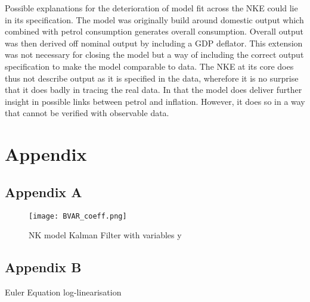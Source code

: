 \documentclass[12pt,a4paper,english]{article} %
\let\oldsection\section
\renewcommand\section{\clearpage\oldsection}
\begin{document}
	Possible explanations for the deterioration of model fit across the NKE could lie in its specification. The model was originally build around domestic output which combined with petrol consumption generates overall consumption. Overall output was then derived off nominal output by including a GDP deflator. This extension was not necessary for closing the model but a way of including the correct output specification to make the model comparable to data. The NKE at its core does thus not describe output as it is specified in the data, wherefore it is no surprise that it does badly in tracing the real data. In that the model does deliver further insight in possible links between petrol and inflation. However, it does so in a way that cannot be verified with observable data.
	
	

	\section*{Appendix}
	
	\pagebreak
	\subsection*{Appendix A} \label{appa}

	\begin{figure}[H]
		\begin{center}
			\texttt{[image: BVAR\_coeff.png]}
			\caption{NK model Kalman Filter with variables y}\label{fig:bvar_coef}
		\end{center}
	\end{figure}

	\pagebreak
	
	\pagebreak
	\subsection*{Appendix B} \label{appb}
	Euler Equation log-linearisation\\
	
\end{document}
